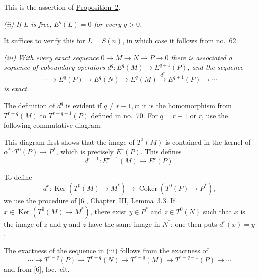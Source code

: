 This is the assertion of
\hyperref[fac:III:4:no:71:prop:2]{Proposition~2}.

\label{fac:III:4:no:72:property:ii}
\textit{(ii) If $L$ is free, $E^q(L)=0$ for every $q>0$.}

It suffices to verify this for $L=S(n)$, in which case it follows from
\hyperref[fac:III:3:no:62]{no.~62}.

\label{fac:III:4:no:72:property:iii}
\textit{(iii) With every exact sequence
$0\longrightarrow M\longrightarrow N\longrightarrow P\longrightarrow0$
there is associated a sequence of coboundary operators
$d^q:E^q(M)\longrightarrow E^{q+1}(P)$, and the sequence}
\label{fac:III:4:no:72:formula:E-long-exact}
\[
\cdots\longrightarrow E^q(P)\longrightarrow E^q(N)
\longrightarrow E^q(M)\xrightarrow{\ d^q\ }E^{q+1}(P)
\longrightarrow\cdots
\]
\textit{is exact.}

The definition of $d^q$ is evident if $q\neq r-1,r$: it is the
homomorphism from $T^{r-q}(M)$ to $T^{r-q-1}(P)$ defined in
\hyperref[fac:III:4:no:70]{no.~70}. For $q=r-1$ or $r$, use the
following commutative diagram:
\label{fac:III:4:no:72:diagram:alpha-star}
\begin{center}
\end{center}
This diagram first shows that the image of $T^1(M)$ is contained in the
kernel of $\alpha^*:T^0(P)\longrightarrow P^*$, which is precisely
$E^r(P)$. This defines
\label{fac:III:4:no:72:map:d-r-minus-1}
\[
d^{r-1}:E^{r-1}(M)\longrightarrow E^r(P).
\]

To define
\label{fac:III:4:no:72:map:d-r}
\[
d^r:\operatorname{Ker}(T^0(M)\longrightarrow M^*)
\longrightarrow\operatorname{Coker}(T^0(P)\longrightarrow P^*),
\]
we use the procedure of [6], Chapter~III, Lemma~3.3. If
$x\in\operatorname{Ker}(T^0(M)\longrightarrow M^*)$, there exist
$y\in P^*$ and $z\in T^0(N)$ such that $x$ is the image of $z$ and
$y$ and $z$ have the same image in $N^*$; one then puts $d^r(x)=y$.

The exactness of the sequence in
\hyperref[fac:III:4:no:72:property:iii]{(iii)} follows from the exactness of
\label{fac:III:4:no:72:formula:T-long-exact}
\[
\cdots\longrightarrow T^{r-q}(P)\longrightarrow T^{r-q}(N)
\longrightarrow T^{r-q}(M)\longrightarrow T^{r-q-1}(P)
\longrightarrow\cdots
\]
and from [6], loc.~cit.

